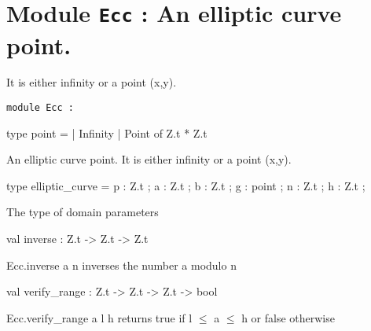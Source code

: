 \documentclass[11pt]{article}
\begin{document}
\tableofcontents
\section{Module {\tt{Ecc}} : An elliptic curve point.}
\label{module:Ecc}
 It is either infinity or a point (x,y).



\ocamldocvspace{0.5cm}



\begin{ocamldoccode}
{\tt{module }}{\tt{Ecc}}{\tt{ : }}\end{ocamldoccode}
\label{module:Ecc.Ecc}

\begin{ocamldocsigend}


\label{type:Ecc.Ecc.point}\begin{ocamldoccode}
type point =
  | Infinity
  | Point of Z.t * Z.t
\end{ocamldoccode}
\begin{ocamldoccomment}
An elliptic curve point. It is either infinity or a point (x,y).
\end{ocamldoccomment}


\label{type:Ecc.Ecc.elliptic-underscorecurve}\begin{ocamldoccode}
type elliptic_curve = {}
  p : Z.t ;
  a : Z.t ;
  b : Z.t ;
  g : point ;
  n : Z.t ;
  h : Z.t ;
{}
\end{ocamldoccode}
\begin{ocamldocdescription}
The type of domain parameters


\end{ocamldocdescription}


\label{val:Ecc.Ecc.inverse}\begin{ocamldoccode}
val inverse : Z.t -> Z.t -> Z.t
\end{ocamldoccode}
\begin{ocamldocdescription}
Ecc.inverse a n inverses the number a modulo n


\end{ocamldocdescription}


\label{val:Ecc.Ecc.verify-underscorerange}\begin{ocamldoccode}
val verify_range : Z.t -> Z.t -> Z.t -> bool
\end{ocamldoccode}
\begin{ocamldocdescription}
Ecc.verify\_range a l h returns true if l $\leq$ a $\leq$ h or false otherwise



\end{ocamldocdescription}
\end{ocamldocsigend}
\end{document}
